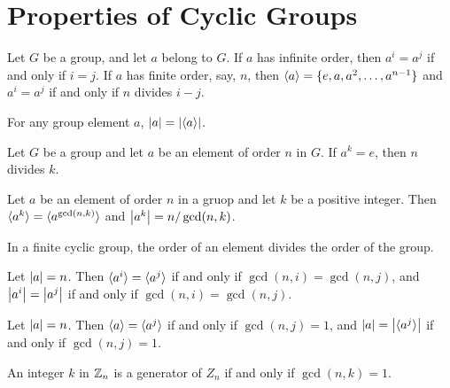\section{Properties of Cyclic Groups}

\begin{theorem}[Criterion for $\mathbf{a^i=a^j}$]
	Let $G$ be a group, and let $a$ belong to $G$. If $a$ has infinite order, then $a^i = a^j$ if and only if $i = j$. If $a$ has finite order, say, $n$, then $\langle a \rangle = \{e, a, a^2, \dots, a^{n - 1}\}$ and $a^i = a^j$ if and only if $n$ divides $i - j$.
\end{theorem}

\begin{corollary}[$\mathbf{\abs{a}=\abs{\cyc{a}}}$]
	For any group element $a$, $\left\lvert a \right\rvert = \left\lvert \langle a \rangle \right\rvert$.
\end{corollary}

\begin{corollary}[$\mathbf{a^k = e}$ Implies That $\mathbf{\abs{a}}$ Divides $\mathbf{k}$]
	Let $G$ be a group and let $a$ be an element of order $n$ in $G$. If $a^k = e$, then $n$ divides $k$.
\end{corollary}

\begin{theorem}[$\mathbf{\cyc{a^k} = \cyc{a^{\textbf{gcd}(n,k)}}}$ and $\mathbf{\abs{a^k} = n/\textbf{gcd}(n,k)}$]
	Let $a$ be an element of order $n$ in a gruop and let $k$ be a positive integer. Then $\langle a^k \rangle = \langle a^{\gcd(n,k)} \rangle$ and $\left\lvert a^k \right\rvert = n / \gcd(n,k)$.
\end{theorem}

\begin{corollary}
	In a finite cyclic group, the order of an element divides the order of the group.
\end{corollary}

\begin{corollary}[Criterion for $\mathbf{\cyc{a^i} = \cyc{a^j}}$ and $\mathbf{\abs{a^i} = \abs{a^j}}$]
	Let $\left\lvert a \right\rvert = n$. Then $\langle a^i \rangle = \langle a^j \rangle$ if and only if $\gcd(n, i) = \gcd(n,j)$, and $\left\lvert a^i \right\rvert = \left\lvert a^j \right\rvert$ if and only if $\gcd(n,i) = \gcd(n,j)$.
\end{corollary}

\begin{corollary}
	Let $\left\lvert a \right\rvert = n$. Then $\langle a \rangle = \langle a^j \rangle$ if and only if $\gcd(n,j) = 1$, and $\left\lvert a \right\rvert = \left\lvert \langle a^j \rangle \right\rvert$ if and only if $\gcd(n,j) = 1$.
\end{corollary}

\begin{corollary}
	An integer $k$ in $\mathbb{Z}_n$ is a generator of $Z_n$ if and only if $\gcd(n,k) = 1$.
\end{corollary}

